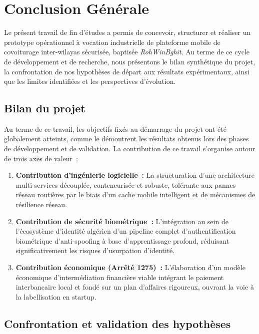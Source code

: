 \chapter*{Conclusion Générale}

Le présent travail de fin d'études a permis de concevoir, structurer et réaliser un prototype opérationnel à vocation industrielle de plateforme mobile de covoiturage inter-wilayas sécurisée, baptisée \textit{RohWinBghit}. Au terme de ce cycle de développement et de recherche, nous présentons le bilan synthétique du projet, la confrontation de nos hypothèses de départ aux résultats expérimentaux, ainsi que les limites identifiées et les perspectives d'évolution.

\section*{Bilan du projet}

Au terme de ce travail, les objectifs fixés au démarrage du projet ont été globalement atteints, comme le démontrent les résultats obtenus lors des phases de développement et de validation. La contribution de ce travail s'organise autour de trois axes de valeur~:
\begin{enumerate}[leftmargin=1.8em]
  \item \textbf{Contribution d'ingénierie logicielle~:} La structuration d'une architecture multi-services découplée, conteneurisée et robuste, tolérante aux pannes réseau routières par le biais d'un cache mobile intelligent et de mécanismes de résilience réseau.
  \item \textbf{Contribution de sécurité biométrique~:} L'intégration au sein de l'écosystème d'identité algérien d'un pipeline complet d'authentification biométrique d'anti-spoofing à base d'apprentissage profond, réduisant significativement les risques d'usurpation d'identité.
  \item \textbf{Contribution économique (Arrêté 1275)~:} L'élaboration d'un modèle économique d'intermédiation financière viable intégrant le paiement interbancaire local et fondé sur un plan d'affaires rigoureux, ouvrant la voie à la labellisation en startup.
\end{enumerate}

\section*{Confrontation et validation des hypothèses}

